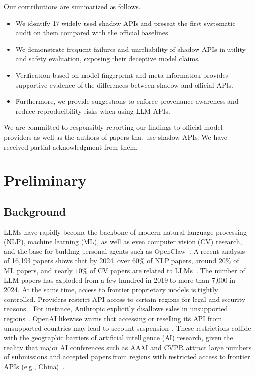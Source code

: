 \documentclass[letterpaper,twocolumn,10pt]{article}
\begin{document}
Our contributions are summarized as follows.
\begin{itemize}[leftmargin=*]
    \item We identify 17 widely used shadow APIs and present the first systematic audit on them compared with the official baselines.
    \item We demonstrate frequent failures and unreliability of shadow APIs in utility and safety evaluation, exposing their deceptive model claims.
    \item Verification based on model fingerprint and meta information provides supportive evidence of the differences between shadow and official APIs.
    \item Furthermore, we provide suggestions to enforce provenance awareness and reduce reproducibility risks when using LLM APIs.
\end{itemize}

We are committed to responsibly reporting our findings to official model providers as well as the authors of papers that use shadow APIs. 
We have received partial acknowledgment from them.

\section{Preliminary}

\subsection{Background}

LLMs have rapidly become the backbone of modern natural language processing (NLP), machine learning (ML), as well as even computer vision (CV) research, and the base for building personal agents such as OpenClaw~\cite{JZSBZ26}.
A recent analysis of 16{,}193 papers shows that by 2024, over $60\%$ of NLP papers, around $20\%$ of ML papers, and nearly $10\%$ of CV papers are related to LLMs~\cite{XZLCLLWL25}. 
The number of LLM papers has exploded from a few hundred in 2019 to more than 7{,}000 in 2024.
At the same time, access to frontier proprietary models is tightly controlled. 
Providers restrict API access to certain regions for legal and security reasons~\cite{G25}. 
For instance, Anthropic explicitly disallows sales in unsupported regions~\cite{A25}.
OpenAI likewise warns that accessing or reselling its API from unsupported countries may lead to account suspension~\cite{O24}.
These restrictions collide with the geographic barriers of artificial intelligence (AI) research, given the reality that major AI conferences such as AAAI and CVPR attract large numbers of submissions and accepted papers from regions with restricted access to frontier APIs (e.g., China)~\cite{A252,L24}.
\end{document}
